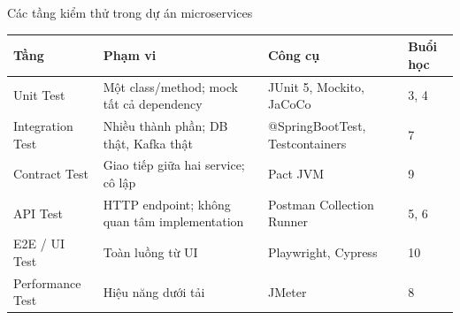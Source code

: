 \documentclass[aspectratio=169,12pt]{beamer}
\begin{document}
\begin{frame}{Các tầng kiểm thử trong dự án microservices}
  \begin{center}
  \scriptsize
  \setlength{\tabcolsep}{3pt}
  \renewcommand{\arraystretch}{0.9}
  \begin{tabular}{p{1.9cm}p{3.1cm}p{3.0cm}p{1.5cm}}
    \toprule
    \textbf{Tầng} & \textbf{Phạm vi} & \textbf{Công cụ} & \textbf{Buổi học} \\
    \midrule
    Unit Test &
    Một class/method; mock tất cả dependency &
    JUnit 5, Mockito, JaCoCo &
    3, 4 \\
    \midrule
    Integration Test &
    Nhiều thành phần; DB thật, Kafka thật &
    @SpringBootTest, Testcontainers &
    7 \\
    \midrule
    Contract Test &
    Giao tiếp giữa hai service; cô lập &
    Pact JVM &
    9 \\
    \midrule
    API Test &
    HTTP endpoint; không quan tâm implementation &
    Postman Collection Runner &
    5, 6 \\
    \midrule
    E2E / UI Test &
    Toàn luồng từ UI &
    Playwright, Cypress &
    10 \\
    \midrule
    Performance Test &
    Hiệu năng dưới tải &
    JMeter &
    8 \\
    \bottomrule
  \end{tabular}
  \end{center}
\end{frame}
\end{document}
